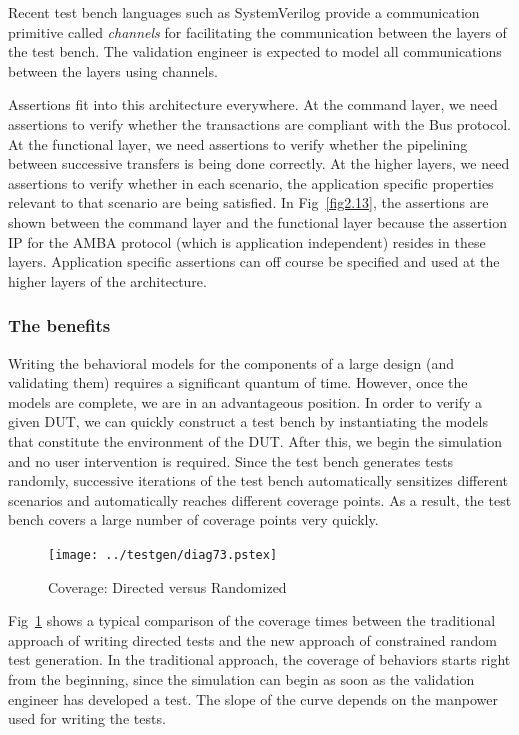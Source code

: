 \noindent
Recent test bench languages such as SystemVerilog provide a communication
primitive called {\em channels} for facilitating the communication between
the layers of the test bench. The validation engineer is expected to model
all communications between the layers using channels.

\noindent
Assertions fit into this architecture everywhere. 
At the command layer, we need assertions to verify
whether the transactions are compliant with the Bus protocol. At 
the functional
layer, we need assertions to verify whether the pipelining between successive
transfers is being done correctly. At the higher layers, we need assertions
to verify whether in each scenario, the application specific properties
relevant to that scenario are being satisfied. In Fig~\ref{fig2.13}, the
assertions are shown between the command layer and the functional layer
because the assertion IP for the AMBA protocol (which is application
independent) resides in these layers. Application specific assertions can
off course be specified and used at the higher layers of the architecture.

\subsubsection{The benefits}
Writing the behavioral models for the components of a large design (and
validating them) requires a significant quantum of time. However, once the
models are complete, we are in an advantageous position. In order to verify a
given DUT, we can quickly construct a test bench by instantiating the models
that constitute the environment of the DUT. After this, we begin the
simulation and no user intervention is required. Since the test bench
generates tests randomly, successive iterations of the test bench
automatically sensitizes different scenarios and automatically reaches
different coverage points. As a result, the test bench covers a
large number of coverage points very quickly.

\begin{figure}[htb]
\centering
\texttt{[image: ../testgen/diag73.pstex]}
\center
\caption{Coverage: Directed versus Randomized} \label{fig2.14}
\end{figure}

\noindent
Fig~\ref{fig2.14} shows a typical comparison of the coverage times between the
traditional approach of writing directed tests and the new approach of
constrained random test generation.
In the traditional approach, the coverage of behaviors starts right from the
beginning, since the simulation can begin as soon as the validation engineer
has developed a test. The slope of the curve depends on the manpower used
for writing the tests.

